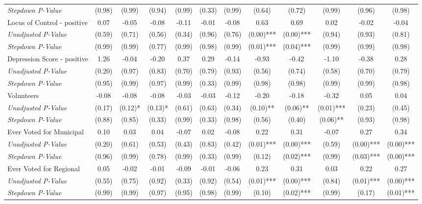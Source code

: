 \begin{tabular}{l c c c c c c c c c c c}
\quad \textit{Stepdown P-Value} & (0.98) & (0.99) & (0.94) & (0.99) & (0.33) & (0.99) & (0.64) & (0.72) & (0.99) & (0.96) & (0.98) \\
Locus of Control - positive & 0.07 & -0.05 & -0.08 & -0.11 & -0.01 & -0.08 & 0.63 & 0.69 & 0.02 & -0.02 & -0.04 \\
\quad \textit{Unadjusted P-Value} & (0.59) & (0.71) & (0.56) & (0.34) & (0.96) & (0.76) & (0.00)*** & (0.00)*** & (0.94) & (0.93) & (0.81) \\
\quad \textit{Stepdown P-Value} & (0.99) & (0.99) & (0.77) & (0.99) & (0.98) & (0.99) & (0.01)*** & (0.04)*** & (0.99) & (0.99) & (0.98) \\
Depression Score - positive & 1.26 & -0.04 & -0.20 & 0.37 & 0.29 & -0.14 & -0.93 & -0.42 & -1.10 & -0.38 & 0.28 \\
\quad \textit{Unadjusted P-Value} & (0.20) & (0.97) & (0.83) & (0.70) & (0.79) & (0.93) & (0.56) & (0.74) & (0.58) & (0.70) & (0.79) \\
\quad \textit{Stepdown P-Value} & (0.95) & (0.99) & (0.97) & (0.99) & (0.33) & (0.99) & (0.98) & (0.98) & (0.99) & (0.99) & (0.98) \\
Volunteers & -0.08 & -0.08 & -0.08 & -0.03 & -0.03 & -0.12 & -0.20 & -0.18 & -0.32 & 0.05 & 0.04 \\
\quad \textit{Unadjusted P-Value} & (0.17) & (0.12)* & (0.13)* & (0.61) & (0.63) & (0.34) & (0.10)** & (0.06)** & (0.01)*** & (0.23) & (0.45) \\
\quad \textit{Stepdown P-Value} & (0.88) & (0.85) & (0.33) & (0.99) & (0.33) & (0.98) & (0.56) & (0.40) & (0.06)** & (0.93) & (0.98) \\
Ever Voted for Municipal & 0.10 & 0.03 & 0.04 & -0.07 & 0.02 & -0.08 & 0.22 & 0.31 & -0.07 & 0.27 & 0.34 \\
\quad \textit{Unadjusted P-Value} & (0.20) & (0.61) & (0.53) & (0.43) & (0.83) & (0.42) & (0.01)*** & (0.00)*** & (0.59) & (0.00)*** & (0.00)*** \\
\quad \textit{Stepdown P-Value} & (0.96) & (0.99) & (0.78) & (0.99) & (0.33) & (0.99) & (0.12) & (0.02)*** & (0.99) & (0.03)*** & (0.00)*** \\
Ever Voted for Regional & 0.05 & -0.02 & -0.01 & -0.09 & -0.01 & -0.06 & 0.23 & 0.31 & 0.03 & 0.22 & 0.27 \\
\quad \textit{Unadjusted P-Value} & (0.55) & (0.75) & (0.92) & (0.33) & (0.92) & (0.54) & (0.01)*** & (0.00)*** & (0.84) & (0.01)*** & (0.00)*** \\
\quad \textit{Stepdown P-Value} & (0.99) & (0.99) & (0.97) & (0.95) & (0.98) & (0.99) & (0.10) & (0.02)*** & (0.99) & (0.17) & (0.01)*** \\

\end{tabular}
